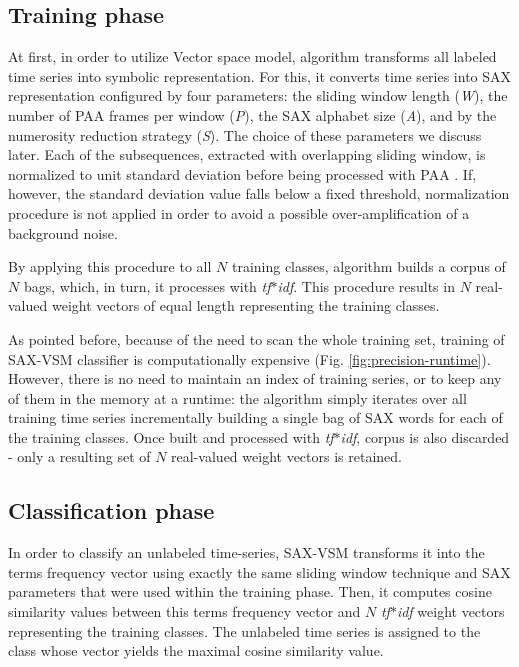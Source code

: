 \documentclass[conference]{IEEEtran}
\begin{document}
\subsection{Training phase}
At first, in order to utilize Vector space model, algorithm transforms all labeled 
time series into symbolic representation. For this, it converts time series into SAX
representation configured by four parameters: the sliding window 
length (\textit{W}), the number of PAA frames per window (\textit{P}), 
the SAX alphabet size (\textit{A}), and by the numerosity reduction strategy (\textit{S}). 
The choice of  these parameters we discuss later.
Each of the subsequences, extracted with overlapping sliding window, 
is normalized to unit standard deviation before being processed with PAA 
\cite{goldin_kanellakis}. 
If, however, the standard deviation value falls below a fixed threshold, normalization 
procedure is not applied in order to avoid a possible over-amplification of a 
background noise.

By applying this procedure to all $N$ training classes, algorithm builds a corpus 
of $N$ bags, which, in turn, it processes with \textit{tf$\ast$idf}. 
This procedure results in $N$ real-valued weight vectors of equal length 
representing the training classes. 

As pointed before, because of the need to scan the whole training set, 
training of SAX-VSM classifier is computationally expensive 
(Fig. \ref{fig:precision-runtime}). However, there is no need to maintain an index 
of training series, or to keep any of them in the memory at a runtime: 
the algorithm simply iterates over all training time series incrementally building 
a single bag of SAX words for each of the training classes. 
Once built and processed with \textit{tf$\ast$idf}, corpus is also discarded - 
only a resulting set of $N$ real-valued weight vectors is retained. 

\subsection{Classification phase}
In order to classify an unlabeled time-series, SAX-VSM transforms it into the 
terms frequency vector using exactly the same sliding window technique and SAX 
parameters that were used within the training phase. 
Then, it computes cosine similarity values between this terms frequency vector and 
$N$ \textit{tf$\ast$idf} weight vectors representing the training classes. 
The unlabeled time series is assigned to the class whose vector yields the maximal 
cosine similarity value.
\end{document}
